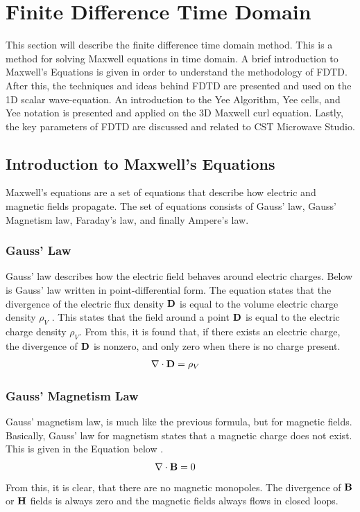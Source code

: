 \section{Finite Difference Time Domain}
\label{sec:fdtd}

\begin{aautop}
    This section will describe the finite difference time domain method. This is a method for solving Maxwell equations in time domain. A brief introduction to Maxwell's Equations is given in order to understand the methodology of FDTD. After this, the techniques and ideas behind FDTD are presented and used on the 1D scalar wave-equation. An introduction to the Yee Algorithm, Yee cells, and Yee notation is presented and applied on the 3D Maxwell curl equation. Lastly, the key parameters of FDTD are discussed and related to CST Microwave Studio.
\end{aautop}

\subsection{Introduction to Maxwell's Equations}
Maxwell's equations are a set of equations that describe how electric and magnetic fields propagate. The set of equations consists of Gauss' law, Gauss' Magnetism law, Faraday's law, and finally Ampere's law. 

\subsubsection{Gauss' Law}
Gauss' law describes how the electric field behaves around electric charges. Below is Gauss' law written in point-differential form. The equation states that the divergence of the electric flux density $\bold{D}$ is equal to the volume electric charge density $\rho_V$ \cite{taflove2000computional}. This states that the field around a point $\bold{D}$ is equal to the electric charge density $\rho_V$. From this, it is found that, if there exists an electric charge, the divergence of $\bold{D}$ is nonzero, and only zero when there is no charge present. 
\begin{align}%
\nabla \cdot \bold{D} &= \rho_V
\end{align}

\subsubsection{Gauss' Magnetism Law}
Gauss' magnetism law, is much like the previous formula, but for magnetic fields. Basically, Gauss' law for magnetism states that a magnetic charge does not exist. This is given in the Equation below \cite{taflove2000computional}. 
\begin{align}%
\nabla \cdot \bold{B} &=0
\end{align}
From this, it is clear, that there are no magnetic monopoles. The divergence of $\bold{B}$ or $\bold{H}$ fields is always zero and the magnetic fields always flows in closed loops. 

